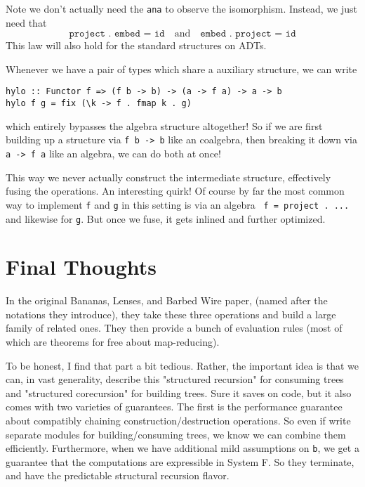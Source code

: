 \documentclass[12pt]{article}
\newcommand{\hask}{\texttt}
\begin{document}
Note we don't actually need the \hask{ana} to observe the isomorphism.
Instead, we just need that 
\[
  \hask{project . embed = id} \quad \text{and} \quad \hask{embed . project = id}
\]
This law will also hold for the standard structures on ADTs.

Whenever we have a pair of types which share a auxiliary structure, we can write
\begin{verbatim}
hylo :: Functor f => (f b -> b) -> (a -> f a) -> a -> b
hylo f g = fix (\k -> f . fmap k . g)
\end{verbatim}
which entirely bypasses the algebra structure altogether!
So if we are first building up a structure via \hask{f b -> b} like an coalgebra, then breaking it down via \hask{a -> f a} like an algebra, we can do both at once!

This way we never actually construct the intermediate structure, effectively fusing the operations. An interesting quirk! 
Of course by far the most common way to implement \hask{f} and \hask{g} in this setting is via an algebra \hask{ f = project . \case ...} and likewise for \hask{g}.
But once we fuse, it gets inlined and further optimized.

\section{Final Thoughts}
In the original Bananas, Lenses, and Barbed Wire paper, (named after the notations they introduce), they take these three operations and build a large family of related ones. They then provide a bunch of evaluation rules (most of which are theorems for free about map-reducing). 

To be honest, I find that part a bit tedious.
Rather, the important idea is that we can, in vast generality, describe this "structured recursion" for consuming trees and "structured corecursion" for building trees. Sure it saves on code, but it also comes with two varieties of guarantees.
The first is the performance guarantee about compatibly chaining construction/destruction operations.
So even if write separate modules for building/consuming trees, we know we can combine them efficiently.
Furthermore, when we have additional mild assumptions on \hask{b}, we get a guarantee that the computations are expressible in System F.
So they terminate, and have the predictable structural recursion flavor.
\end{document}
